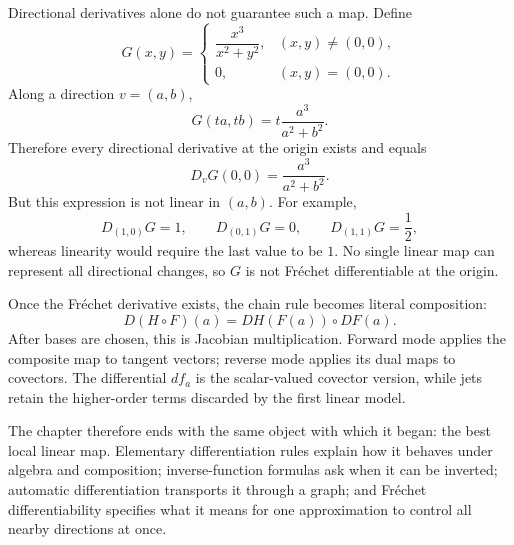 Directional derivatives alone do not guarantee such a map.  Define
\[
  G(x,y)=
  \begin{cases}
  \dfrac{x^3}{x^2+y^2},&(x,y)\ne(0,0),\\[0.8em]
  0,&(x,y)=(0,0).
  \end{cases}
\]
Along a direction \(v=(a,b)\),
\[
  G(ta,tb)
  =t\frac{a^3}{a^2+b^2}.
\]
Therefore every directional derivative at the origin exists and equals
\[
  D_vG(0,0)=\frac{a^3}{a^2+b^2}.
\]
But this expression is not linear in \((a,b)\).  For example,
\[
  D_{(1,0)}G=1,
  \qquad
  D_{(0,1)}G=0,
  \qquad
  D_{(1,1)}G=\frac12,
\]
whereas linearity would require the last value to be \(1\).  No single linear map can represent all directional changes, so \(G\) is not Fr\'echet differentiable at the origin.

Once the Fr\'echet derivative exists, the chain rule becomes literal composition:
\[
  D(H\circ F)(a)=DH(F(a))\circ DF(a).
\]
After bases are chosen, this is Jacobian multiplication.  Forward mode applies the composite map to tangent vectors; reverse mode applies its dual maps to covectors.  The differential \(df_a\) is the scalar-valued covector version, while jets retain the higher-order terms discarded by the first linear model.

The chapter therefore ends with the same object with which it began: the best local linear map.  Elementary differentiation rules explain how it behaves under algebra and composition; inverse-function formulas ask when it can be inverted; automatic differentiation transports it through a graph; and Fr\'echet differentiability specifies what it means for one approximation to control all nearby directions at once.

